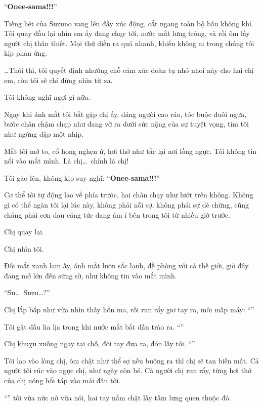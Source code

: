 \documentclass[../main.tex]{subfiles}
\begin{document}
``\textbf{Onee-sama!!!}''

Tiếng hét của Suzuno vang lên đầy xúc động, cắt ngang toàn bộ bầu không khí. Tôi quay đầu lại nhìn em ấy đang chạy tới, nước mắt lưng tròng, và rồi ôm lấy người chị thân thiết. Mọi thứ diễn ra quá nhanh, khiến không ai trong chúng tôi kịp phản ứng.

\dots Thôi thì, tôi quyết định nhường chỗ cảm xúc đoàn tụ nhỏ nhoi này cho hai chị em, còn tôi sẽ chỉ đứng nhìn từ xa.


Tôi không nghĩ ngợi gì nữa.

Ngay khi ánh mắt tôi bắt gặp chị ấy, dáng người cao ráo, tóc buộc đuôi ngựa, bước chân chậm chạp như đang vỡ ra dưới sức nặng của sự tuyệt vọng, tim tôi như ngừng đập một nhịp.

Mắt tôi mở to, cổ họng nghẹn ứ, hơi thở như tắc lại nơi lồng ngực. Tôi không tin nổi vào mắt mình. Là chị\dots\ chính là chị!

Tôi gào lên, không kịp suy nghĩ: ``\textbf{Onee-sama!!!}''

Cơ thể tôi tự động lao về phía trước, hai chân chạy như lướt trên không. Không gì có thể ngăn tôi lại lúc này, không phải nỗi sợ, không phải sự dè chừng, cũng chẳng phải cơn đau căng tức đang âm ỉ bên trong tôi từ nhiều giờ trước.

Chị quay lại.

Chị nhìn tôi.

Đôi mắt xanh lam ấy, ánh mắt luôn sắc lạnh, đề phòng với cả thế giới, giờ đây đang mở lớn đến sững sờ, như không tin vào mắt mình.

``Su\dots\ Suzu\dots?''

Chị lắp bắp như vừa nhìn thấy hồn ma, rồi run rẩy giơ tay ra, môi mấp máy: ``''

Tôi gật đầu lia lịa trong khi nước mắt bắt đầu trào ra. ``''

Chị khuỵu xuống ngay tại chỗ, đôi tay đưa ra, đón lấy tôi. ``''

Tôi lao vào lòng chị, ôm chặt như thể sợ nếu buông ra thì chị sẽ tan biến mất. Cả người tôi rúc vào ngực chị, như ngày còn bé. Cả người chị run rẩy, từng hơi thở của chị nóng hổi táp vào mái đầu tôi.

``'' tôi vừa nức nở vừa nói, hai tay nắm chặt lấy tấm lưng quen thuộc đó.
\end{document}
